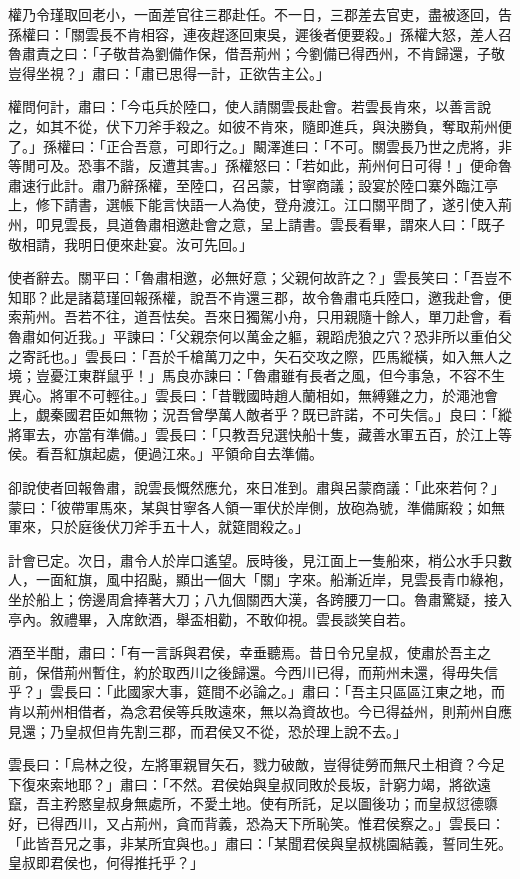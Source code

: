 權乃令瑾取回老小，一面差官往三郡赴任。不一日，三郡差去官吏，盡被逐回，告孫權曰：「關雲長不肯相容，連夜趕逐回東吳，遲後者便要殺。」孫權大怒，差人召魯肅責之曰：「子敬昔為劉備作保，借吾荊州；今劉備已得西州，不肯歸還，子敬豈得坐視？」肅曰：「肅已思得一計，正欲告主公。」

權問何計，肅曰：「今屯兵於陸口，使人請關雲長赴會。若雲長肯來，以善言說之，如其不從，伏下刀斧手殺之。如彼不肯來，隨即進兵，與決勝負，奪取荊州便了。」孫權曰：「正合吾意，可即行之。」闞澤進曰：「不可。關雲長乃世之虎將，非等閒可及。恐事不諧，反遭其害。」孫權怒曰：「若如此，荊州何日可得！」便命魯肅速行此計。肅乃辭孫權，至陸口，召呂蒙，甘寧商議；設宴於陸口寨外臨江亭上，修下請書，選帳下能言快語一人為使，登舟渡江。江口關平問了，遂引使入荊州，叩見雲長，具道魯肅相邀赴會之意，呈上請書。雲長看畢，謂來人曰：「既子敬相請，我明日便來赴宴。汝可先回。」

使者辭去。關平曰：「魯肅相邀，必無好意；父親何故許之？」雲長笑曰：「吾豈不知耶？此是諸葛瑾回報孫權，說吾不肯還三郡，故令魯肅屯兵陸口，邀我赴會，便索荊州。吾若不往，道吾怯矣。吾來日獨駕小舟，只用親隨十餘人，單刀赴會，看魯肅如何近我。」平諫曰：「父親奈何以萬金之軀，親蹈虎狼之穴？恐非所以重伯父之寄託也。」雲長曰：「吾於千槍萬刀之中，矢石交攻之際，匹馬縱橫，如入無人之境；豈憂江東群鼠乎！」馬良亦諫曰：「魯肅雖有長者之風，但今事急，不容不生異心。將軍不可輕往。」雲長曰：「昔戰國時趙人蘭相如，無縛雞之力，於澠池會上，覷秦國君臣如無物；況吾曾學萬人敵者乎？既已許諾，不可失信。」良曰：「縱將軍去，亦當有準備。」雲長曰：「只教吾兒選快船十隻，藏善水軍五百，於江上等侯。看吾紅旗起處，便過江來。」平領命自去準備。

卻說使者回報魯肅，說雲長慨然應允，來日准到。肅與呂蒙商議：「此來若何？」蒙曰：「彼帶軍馬來，某與甘寧各人領一軍伏於岸側，放砲為號，準備廝殺；如無軍來，只於庭後伏刀斧手五十人，就筵間殺之。」

計會已定。次日，肅令人於岸口遙望。辰時後，見江面上一隻船來，梢公水手只數人，一面紅旗，風中招颭，顯出一個大「關」字來。船漸近岸，見雲長青巾綠袍，坐於船上；傍邊周倉捧著大刀；八九個關西大漢，各跨腰刀一口。魯肅驚疑，接入亭內。敘禮畢，入席飲酒，舉盃相勸，不敢仰視。雲長談笑自若。

酒至半酣，肅曰：「有一言訴與君侯，幸垂聽焉。昔日令兄皇叔，使肅於吾主之前，保借荊州暫住，約於取西川之後歸還。今西川已得，而荊州未還，得毋失信乎？」雲長曰：「此國家大事，筵間不必論之。」肅曰：「吾主只區區江東之地，而肯以荊州相借者，為念君侯等兵敗遠來，無以為資故也。今已得益州，則荊州自應見還；乃皇叔但肯先割三郡，而君侯又不從，恐於理上說不去。」

雲長曰：「烏林之役，左將軍親冒矢石，戮力破敵，豈得徒勞而無尺土相資？今足下復來索地耶？」肅曰：「不然。君侯始與皇叔同敗於長坂，計窮力竭，將欲遠竄，吾主矜愍皇叔身無處所，不愛土地。使有所託，足以圖後功；而皇叔愆德隳好，已得西川，又占荊州，貪而背義，恐為天下所恥笑。惟君侯察之。」雲長曰：「此皆吾兄之事，非某所宜與也。」肅曰：「某聞君侯與皇叔桃園結義，誓同生死。皇叔即君侯也，何得推托乎？」

